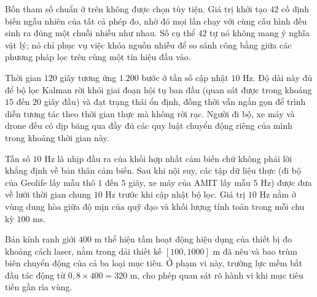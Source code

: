 \begin{table}[H]
\centering
\caption{Thông số mô phỏng chuẩn}
\label{tab:sim-params-week4}
\end{table}

Bốn tham số chuẩn ở trên không được chọn tùy tiện. Giá trị khởi tạo $42$ cố định biến ngẫu nhiên của tất cả phép đo, nhờ đó mọi lần chạy với cùng cấu hình đều sinh ra đúng một chuỗi nhiễu như nhau. Số cụ thể $42$ tự nó không mang ý nghĩa vật lý; nó chỉ phục vụ việc khóa nguồn nhiễu để so sánh công bằng giữa các phương pháp lọc trên cùng một tín hiệu đầu vào.

Thời gian $120$ giây tương ứng $1.200$ bước ở tần số cập nhật $10$ Hz. Độ dài này đủ để bộ lọc Kalman rời khỏi giai đoạn hội tụ ban đầu (quan sát được trong khoảng $15$ đến $20$ giây đầu) và đạt trạng thái ổn định, đồng thời vẫn ngắn gọn để trình diễn tương tác theo thời gian thực mà không rời rạc. Người đi bộ, xe máy và drone đều có dịp băng qua đầy đủ các quy luật chuyển động riêng của mình trong khoảng thời gian này.

Tần số $10$ Hz là nhịp đầu ra của khối hợp nhất cảm biến chứ không phải lời khẳng định về bản thân cảm biến. Sau khi nội suy, các tập dữ liệu thực (đi bộ của Geolife lấy mẫu thô $1$ đến $5$ giây, xe máy của AMIT lấy mẫu $5$ Hz) được đưa về lưới thời gian chung $10$ Hz trước khi cập nhật bộ lọc. Giá trị $10$ Hz nằm ở vùng dung hòa giữa độ mịn của quỹ đạo và khối lượng tính toán trong mỗi chu kỳ $100$ ms.

Bán kính ranh giới $400$ m thể hiện tầm hoạt động hiệu dụng của thiết bị đo khoảng cách laser, nằm trong dải thiết kế $[100, 1000]$ m đã nêu và bao trùm biên chuyển động của cả ba loại mục tiêu. Ở phạm vi này, trường lực mềm bắt đầu tác động từ $0{,}8 \times 400 = 320$ m, cho phép quan sát rõ hành vi khi mục tiêu tiến gần rìa vùng.

